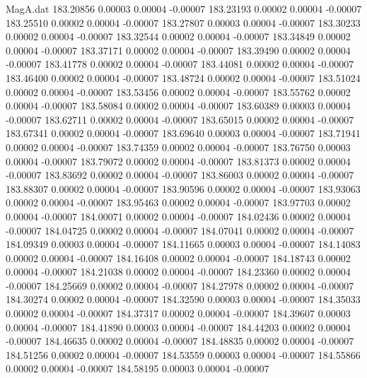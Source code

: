 \begin{filecontents}{MagA.dat}
 183.20856    0.00003    0.00004   -0.00007
 183.23193    0.00002    0.00004   -0.00007
 183.25510    0.00002    0.00004   -0.00007
 183.27807    0.00003    0.00004   -0.00007
 183.30233    0.00002    0.00004   -0.00007
 183.32544    0.00002    0.00004   -0.00007
 183.34849    0.00002    0.00004   -0.00007
 183.37171    0.00002    0.00004   -0.00007
 183.39490    0.00002    0.00004   -0.00007
 183.41778    0.00002    0.00004   -0.00007
 183.44081    0.00002    0.00004   -0.00007
 183.46400    0.00002    0.00004   -0.00007
 183.48724    0.00002    0.00004   -0.00007
 183.51024    0.00002    0.00004   -0.00007
 183.53456    0.00002    0.00004   -0.00007
 183.55762    0.00002    0.00004   -0.00007
 183.58084    0.00002    0.00004   -0.00007
 183.60389    0.00003    0.00004   -0.00007
 183.62711    0.00002    0.00004   -0.00007
 183.65015    0.00002    0.00004   -0.00007
 183.67341    0.00002    0.00004   -0.00007
 183.69640    0.00003    0.00004   -0.00007
 183.71941    0.00002    0.00004   -0.00007
 183.74359    0.00002    0.00004   -0.00007
 183.76750    0.00003    0.00004   -0.00007
 183.79072    0.00002    0.00004   -0.00007
 183.81373    0.00002    0.00004   -0.00007
 183.83692    0.00002    0.00004   -0.00007
 183.86003    0.00002    0.00004   -0.00007
 183.88307    0.00002    0.00004   -0.00007
 183.90596    0.00002    0.00004   -0.00007
 183.93063    0.00002    0.00004   -0.00007
 183.95463    0.00002    0.00004   -0.00007
 183.97703    0.00002    0.00004   -0.00007
 184.00071    0.00002    0.00004   -0.00007
 184.02436    0.00002    0.00004   -0.00007
 184.04725    0.00002    0.00004   -0.00007
 184.07041    0.00002    0.00004   -0.00007
 184.09349    0.00003    0.00004   -0.00007
 184.11665    0.00003    0.00004   -0.00007
 184.14083    0.00002    0.00004   -0.00007
 184.16408    0.00002    0.00004   -0.00007
 184.18743    0.00002    0.00004   -0.00007
 184.21038    0.00002    0.00004   -0.00007
 184.23360    0.00002    0.00004   -0.00007
 184.25669    0.00002    0.00004   -0.00007
 184.27978    0.00002    0.00004   -0.00007
 184.30274    0.00002    0.00004   -0.00007
 184.32590    0.00003    0.00004   -0.00007
 184.35033    0.00002    0.00004   -0.00007
 184.37317    0.00002    0.00004   -0.00007
 184.39607    0.00003    0.00004   -0.00007
 184.41890    0.00003    0.00004   -0.00007
 184.44203    0.00002    0.00004   -0.00007
 184.46635    0.00002    0.00004   -0.00007
 184.48835    0.00002    0.00004   -0.00007
 184.51256    0.00002    0.00004   -0.00007
 184.53559    0.00003    0.00004   -0.00007
 184.55866    0.00002    0.00004   -0.00007
 184.58195    0.00003    0.00004   -0.00007

\end{filecontents}

